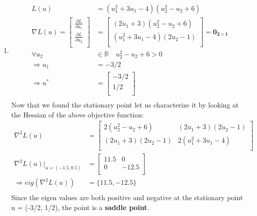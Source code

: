 \begin{enumerate}
\begin{enumerate}
  \item %
  \begin{align*}
    L(u) &= (u_1^2 + 3 u_1 - 4) (u_2 ^2 - u_2 + 6) \\
    \nabla L(u) = \begin{bmatrix}
			  \frac{\partial L}{\partial u_1} \\[6pt]
			  \frac{\partial L}{\partial u_2} \\
			  \end{bmatrix}  &= 
			  \begin{bmatrix}
			    (2 u_1 + 3) (u_2^2 -u_2 + 6) \\
			    (u_1^2 + 3u_1 -4) (2 u_2 -1) \\
			    \end{bmatrix}  = \mathbf{0_{2\times1}}\\[6pt]
	\forall u_2 &\in \mathbb{R} \quad u_2^2 - u_2 + 6 > 0 \\	 
	\Rightarrow u_1 &= -3/2 \\
	\Rightarrow u^* &= \begin{bmatrix}
	                 -3/2 \\
	                 1/2 \\
	                \end{bmatrix}\\
  \end{align*}
  Now that we found the stationary point let us characterize it by looking at
the Hessian of the above objective function:
  \begin{align*}
   \nabla^2 L(u) &= \begin{bmatrix}
                    2 (u_2^2 -u_2 + 6) & (2u_1+3)(2u_2-1) \\
                    (2u_1+3)(2u_2 - 1) & 2(u_1^2 +3 u_1 - 4) \\
                   \end{bmatrix} \\
    \nabla^2 L(u) |_{u = (-1.5,0.5)} &= \begin{bmatrix}
                                         11.5 & 0 \\
                                         0 & -12.5\\
                                        \end{bmatrix}\\
     \Rightarrow eig(\nabla^2 L(u)) &= \{ 11.5,-12.5\} \\
  \end{align*}
  Since the eigen values are both positive and negative at the stationary point
u = (-3/2, 1/2), the point is a \textbf{saddle point}. 
  \end{enumerate}
  

\end{enumerate}
